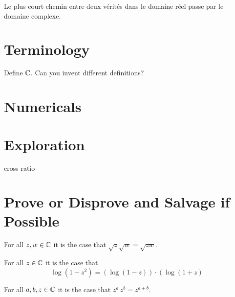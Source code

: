 \documentclass{homework}
\author{Jim Fowler}
\begin{document}
\maketitle

\begin{inspiration}
Le plus court chemin entre deux v\'erit\'es dans le domaine r\'eel passe par le domaine complexe.
\end{inspiration}

\section{Terminology}

\begin{problem}
  Define $\mathbb{C}$.  Can you invent different definitions?
\end{problem}

\section{Numericals}

\section{Exploration}

cross ratio

\section{Prove or Disprove and Salvage if Possible}

\begin{problem}
 For all $z, w \in \mathbb{C}$ it is the case that $\sqrt{z} \sqrt{w} = \sqrt{zw}$.
\end{problem}

\begin{problem}
  For all $z \in \mathbb{C}$ it is the case that
  \[
    \log \left( 1 - z^2 \right) = \left( \log \left( 1 - z \right) \right) \cdot \left( \log \left( 1 + z \right) \right.
  \]
\end{problem}

\begin{problem}
 For all $a, b, z \in \mathbb{C}$ it is the case that $z^a \, z^b = z^{a+b}$.
\end{problem}
\end{document}
